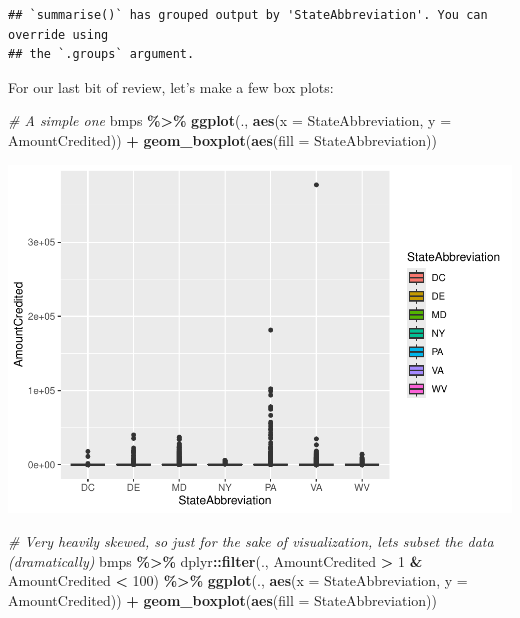 \documentclass[]{article}
\newenvironment{Shaded}{\begin{snugshade}}{\end{snugshade}}
\newcommand{\AttributeTok}[1]{\textcolor[rgb]{0.13,0.29,0.53}{#1}}
\newcommand{\CommentTok}[1]{\textcolor[rgb]{0.56,0.35,0.01}{\textit{#1}}}
\newcommand{\DecValTok}[1]{\textcolor[rgb]{0.00,0.00,0.81}{#1}}
\newcommand{\FunctionTok}[1]{\textcolor[rgb]{0.13,0.29,0.53}{\textbf{#1}}}
\newcommand{\NormalTok}[1]{#1}
\newcommand{\SpecialCharTok}[1]{\textcolor[rgb]{0.81,0.36,0.00}{\textbf{#1}}}
\begin{document}
\begin{verbatim}
## `summarise()` has grouped output by 'StateAbbreviation'. You can override using
## the `.groups` argument.
\end{verbatim}

For our last bit of review, let's make a few box plots:

\begin{Shaded}
\begin{Highlighting}[]
\CommentTok{\# A simple one}
\NormalTok{bmps }\SpecialCharTok{\%\textgreater{}\%} \FunctionTok{ggplot}\NormalTok{(., }\FunctionTok{aes}\NormalTok{(}\AttributeTok{x =}\NormalTok{ StateAbbreviation, }\AttributeTok{y =}\NormalTok{ AmountCredited)) }\SpecialCharTok{+}
  \FunctionTok{geom\_boxplot}\NormalTok{(}\FunctionTok{aes}\NormalTok{(}\AttributeTok{fill =}\NormalTok{ StateAbbreviation))}
\end{Highlighting}
\end{Shaded}

\includegraphics{lab02_files/figure-latex/review3-1.pdf}

\begin{Shaded}
\begin{Highlighting}[]
\CommentTok{\# Very heavily skewed, so just for the sake of visualization, let\textquotesingle{}s subset the data (dramatically)}
\NormalTok{bmps }\SpecialCharTok{\%\textgreater{}\%} 
\NormalTok{  dplyr}\SpecialCharTok{::}\FunctionTok{filter}\NormalTok{(., AmountCredited }\SpecialCharTok{\textgreater{}} \DecValTok{1} \SpecialCharTok{\&}\NormalTok{ AmountCredited }\SpecialCharTok{\textless{}} \DecValTok{100}\NormalTok{) }\SpecialCharTok{\%\textgreater{}\%} 
  \FunctionTok{ggplot}\NormalTok{(., }\FunctionTok{aes}\NormalTok{(}\AttributeTok{x =}\NormalTok{ StateAbbreviation, }\AttributeTok{y =}\NormalTok{ AmountCredited)) }\SpecialCharTok{+}
  \FunctionTok{geom\_boxplot}\NormalTok{(}\FunctionTok{aes}\NormalTok{(}\AttributeTok{fill =}\NormalTok{ StateAbbreviation))}
\end{Highlighting}
\end{Shaded}
\end{document}
